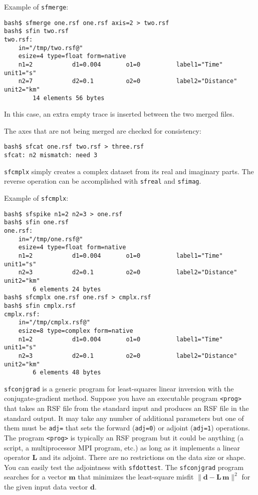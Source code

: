 Example of \texttt{sfmerge}:
\begin{verbatim}
bash$ sfmerge one.rsf one.rsf axis=2 > two.rsf
bash$ sfin two.rsf
two.rsf:
    in="/tmp/two.rsf@"
    esize=4 type=float form=native
    n1=2           d1=0.004       o1=0          label1="Time" unit1="s"
    n2=7           d2=0.1         o2=0          label2="Distance" unit2="km"
        14 elements 56 bytes
\end{verbatim}
In this case, an extra empty trace is inserted between the two merged files.

The axes that are not being merged are checked for consistency:
\begin{verbatim}
bash$ sfcat one.rsf two.rsf > three.rsf
sfcat: n2 mismatch: need 3
\end{verbatim}

\noindent\doublebox{\parbox{\textwidth}{

}}

\texttt{sfcmplx} simply creates a complex dataset from its real and
imaginary parts. The reverse operation can be accomplished with
\texttt{sfreal} and \texttt{sfimag}.

Example of \texttt{sfcmplx}:
\begin{verbatim}
bash$ sfspike n1=2 n2=3 > one.rsf
bash$ sfin one.rsf
one.rsf:
    in="/tmp/one.rsf@"
    esize=4 type=float form=native
    n1=2           d1=0.004       o1=0          label1="Time" unit1="s"
    n2=3           d2=0.1         o2=0          label2="Distance" unit2="km"
        6 elements 24 bytes
bash$ sfcmplx one.rsf one.rsf > cmplx.rsf
bash$ sfin cmplx.rsf
cmplx.rsf:
    in="/tmp/cmplx.rsf@"
    esize=8 type=complex form=native
    n1=2           d1=0.004       o1=0          label1="Time" unit1="s"
    n2=3           d2=0.1         o2=0          label2="Distance" unit2="km"
        6 elements 48 bytes
\end{verbatim}

\noindent\doublebox{\parbox{\textwidth}{
    
}}

\texttt{sfconjgrad} is a generic program for least-squares linear
inversion with the conjugate-gradient method. Suppose you have an
executable program \texttt{<prog>} that takes an RSF file from the
standard input and produces an RSF file in the standard output. It may
take any number of additional parameters but one of them must be
\texttt{adj=} that sets the forward (\texttt{adj=0}) or adjoint
(\texttt{adj=1}) operations.  The program \texttt{<prog>} is typically
an RSF program but it could be anything (a script, a multiprocessor
MPI program, etc.) as long as it implements a linear operator
$\mathbf{L}$ and its adjoint. There are no restrictions on the data
size or shape. You can easily test the adjointness with
\texttt{sfdottest}. The \texttt{sfconjgrad} program searches for a
vector $\mathbf{m}$ that minimizes the least-square misfit 
$\|\mathbf{d - L\,m}\|^2$ for the given input data vector $\mathbf{d}$.

